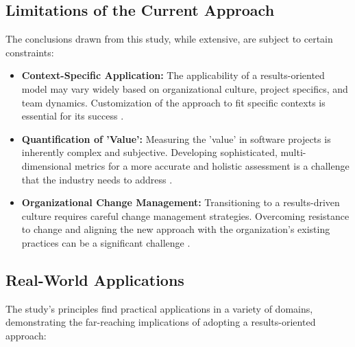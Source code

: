 \documentclass{article}
\begin{document}
\subsection{Limitations of the Current Approach}
The conclusions drawn from this study, while extensive, are subject to certain constraints:
\begin{itemize}
    \item \textbf{Context-Specific Application:} The applicability of a results-oriented model may vary widely based on organizational culture, project specifics, and team dynamics. Customization of the approach to fit specific contexts is essential for its success \cite{Meckenstock2021ECIS}.
    
    \item \textbf{Quantification of 'Value':} Measuring the 'value' in software projects is inherently complex and subjective. Developing sophisticated, multi-dimensional metrics for a more accurate and holistic assessment is a challenge that the industry needs to address \cite{Lowe2019SoftwareMetrics}.
    
    \item \textbf{Organizational Change Management:} Transitioning to a results-driven culture requires careful change management strategies. Overcoming resistance to change and aligning the new approach with the organization’s existing practices can be a significant challenge \cite{FernandesWardAraujo2022}.
\end{itemize}

\subsection{Real-World Applications}
The study's principles find practical applications in a variety of domains, demonstrating the far-reaching implications of adopting a results-oriented approach:
\end{document}
